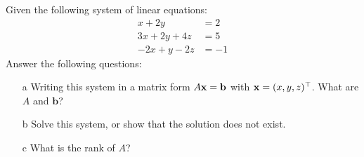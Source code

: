 \begin{question}
\label{q:linear_equations}
Given the following system of linear equations:
\begin{equation*}
\begin{aligned}
    x + 2y &= 2 \\
    3x + 2y + 4z &= 5  \\
    -2x + y - 2z &= -1
\end{aligned}
\end{equation*}
Answer the following questions:
\begin{itemize}
    \item[a] Writing this system in a matrix form $A\mathbf{x} = \mathbf{b}$ with $\mathbf{x} = (x, y, z)^\top$. What are $A$ and $\mathbf{b}$?
    \item[b] Solve this system, or show that the solution does not exist.
    \item[c] What is the rank of $A$?
\end{itemize}
\end{question}
